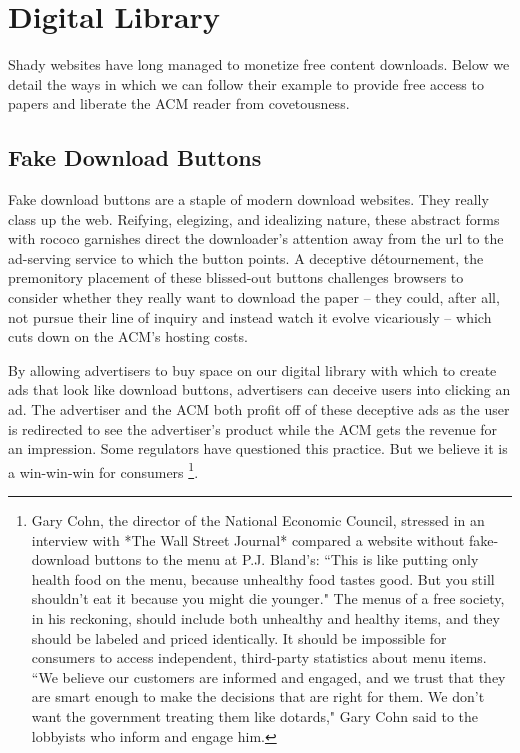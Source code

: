 \section{Digital Library}
\label{sec:lib}
Shady websites have long managed to monetize free content downloads.
Below we detail the ways in which we can follow their example to provide free
access to papers and liberate the ACM reader from covetousness.

\subsection{Fake Download Buttons}
\label{sec:fake}

Fake download buttons are a staple of modern download websites. They really class up the web. Reifying, elegizing, and idealizing nature, these abstract forms with rococo garnishes direct the downloader's attention away from the url to the ad-serving service to which the button points. A deceptive d\'{e}tournement, the premonitory placement of these blissed-out buttons challenges browsers to consider whether they really want to download the paper -- they could, after all, not pursue their line of inquiry and instead watch it evolve vicariously -- which cuts down on the ACM's hosting costs.

By allowing advertisers to buy space on our digital library with which to
create ads that look like download buttons, advertisers can deceive users into
clicking an ad.
The advertiser and the ACM both profit off of these deceptive ads as the user
is redirected to see the advertiser's product while the ACM gets the revenue
for an impression. Some regulators have questioned this practice. But we believe it is a win-win-win for consumers \footnote{Gary Cohn, the director of the National Economic Council, stressed in an interview with *The Wall Street Journal* compared a website without fake-download buttons to the menu at P.J. Bland's: ``This is like putting only health food on the menu, because unhealthy food tastes good. But you still shouldn't eat it because you might die younger." The menus of a free society, in his reckoning, should include both unhealthy and healthy items, and they should be labeled and priced identically. It should be impossible for consumers to access independent, third-party statistics about menu items. ``We believe our customers are informed and engaged, and we trust that they are smart enough to make the decisions that are right for them. We don't want the government treating them like dotards," Gary Cohn said to the lobbyists who inform and engage him.}.


